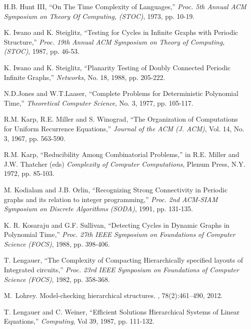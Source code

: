 \begin{thebibliography}{HMRR93}
 H.B. Hunt III,
``On The Time Complexity of Languages,''
{\em Proc.  5th Annual ACM Symposium on Theory Of Computing, (STOC)}, 
1973, pp. 10-19.






  K. Iwano and  K. Steiglitz,
``Testing for Cycles in  Infinite Graphs with Periodic Structure,''
{\em Proc.  19th Annual ACM Symposium on Theory of Computing, (STOC)}, 
1987, pp. 46-53.



  K. Iwano and  K. Steiglitz,
``Planarity Testing of Doubly Connected Periodic Infinite Graphs,''
{\em Networks},
No. 18, 1988, pp. 205-222.




N.D.Jones and W.T.Laaser, 
``Complete Problems for Deterministic Polynomial Time,'' 
{\em Theoretical Computer Science},
No.  3, 1977, pp. 105-117.


R.M. Karp, R.E. Miller and S. Winograd,
``The Organization of Computations for Uniform Recurrence Equations,''
{\em Journal of the ACM (J. ACM)}, Vol. 14, No. 3, 1967, pp. 563-590.




R.M. Karp,
``Reducibility Among Combinatorial Problems,''
in R.E. Miller and J.W. Thatcher (eds)
{\em Complexity of Computer  Computations}, Plenum Press,
N.Y. 1972, pp. 85-103.


M. Kodialam and  J.B. Orlin,
``Recognizing Strong Connectivity in Periodic graphs
and its relation to integer programming,''
{\em Proc. 2nd  ACM-SIAM Symposium on Discrete Algorithms (SODA)},
1991, pp. 131-135.

  K. R. Kosaraju and G.F. Sullivan,
``Detecting Cycles in  Dynamic Graphs in Polynomial Time,''
{\em Proc.  27th IEEE Symposium on Foundations of Computer Science (FOCS)}, 
1988, pp. 398-406.

T. Lengauer,
``The Complexity of  Compacting Hierarchically specified layouts of
Integrated circuits,''
{\em Proc. 23rd IEEE Symposium on Foundations of Computer Science (FOCS)}, 
1982, pp. 358-368.

M.~Lohrey.
\newblock Model-checking hierarchical structures.
, 78(2):461--490, 2012.


T. Lengauer and  C. Weiner,
``Efficient Solutions Hierarchical Systems of Linear Equations,''  
{\em  Computing}, Vol 39, 1987, pp. 111-132.





\end{thebibliography}
